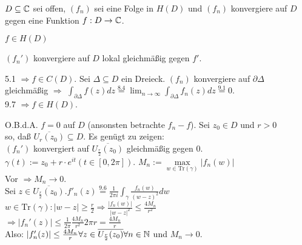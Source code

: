 \documentclass[a4paper,twoside,DIV15,BCOR12mm]{scrbook}
\def\Tr{\text{Tr}}
\begin{document}

\begin{satz}
$D \subseteq \mathbb{C}$ sei offen, $(f_n)$ sei eine Folge in $H(D)$ und $(f_n)$ konvergiere auf $D$  gegen eine Funktion $f: D \rightarrow \mathbb{C}$.
\begin{liste}
\item $f \in H(D)$
\item $(f_n')$ konvergiere auf $D$ lokal gleichmäßig gegen $f'$.
\end{liste}
\end{satz}

\begin{beweis}
\begin{liste}
\item 5.1 $\Rightarrow f \in C(D)$. Sei $\Delta \subseteq D$ ein Dreieck. $(f_n)$ konvergiere auf $\partial\Delta$ \\
gleichmäßig $\Rightarrow$ $\int_{\partial\Delta} f(z) dz \stackrel{8.4}{=} \lim_{n\to\infty}\int_{\partial\Delta}f_n(z) dz \stackrel{9.1}{=} 0$.\\
9.7 $\Rightarrow f \in H(D)$.
\item O.B.d.A. $f = 0$ auf $D$ (ansonsten betrachte $f_n - f$). Sei $z_0 \in D$ und $r > 0$ \\
so, daß $\overline{U_r(z_0)} \subseteq D$. Es genügt zu zeigen: \\
$(f_n')$ konvergiert auf $\overline{U_{\frac{r}{2}}(z_0)}$ gleichmäßig gegen $0$.\\
$\gamma (t) := z_0 + r \cdot e^{it} (t \in [0,2\pi])$. $M_n := \max\limits _{w \in \Tr(\gamma)} |f_n(w)|$\\
Vor $\Rightarrow M_n \to 0$.\\
Sei $z \in \overline{U_{\frac{r}{2}}(z_0)}. {f'}_n (z) \stackrel{9.6}{=} \frac{1}{2 \pi i} \int_{\gamma} \frac{f_n(w)}{(w-z)^2}dw$\\
$w \in \Tr(\gamma) : |w-z| \geq \frac{r}{2} \Rightarrow \frac{|f_n(w)|}{|w-z|^2} \leq \frac{4 M_n}{r^2}$\\
$\Rightarrow |f_n ' (z)| \leq \frac{1}{2\pi} \frac{4 M_n}{r^2} 2 \pi r = \frac{4 M_n}{r}$\\
Also: $|f_n'(z)| \leq \frac{4 M_n}{r} \forall z \in \overline{U_{\frac{r}{2}}(z_0)} \forall n \in \mathbb{N}$ und $M_n \to 0$.
\end{liste}
\end{beweis}
\end{document}
